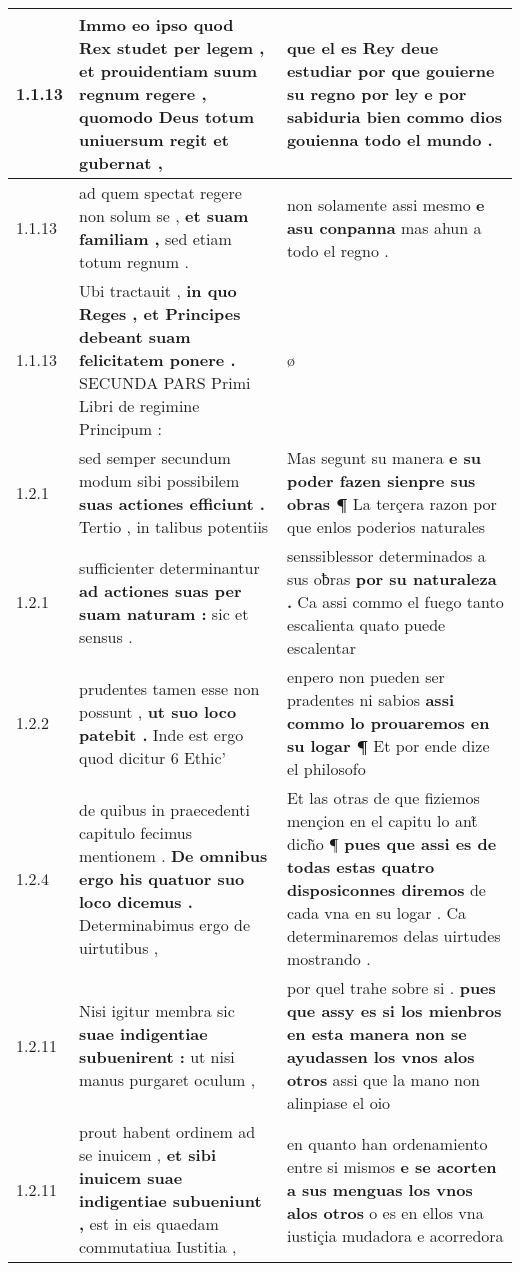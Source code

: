 \begin{tabular}{|p{1cm}|p{6.5cm}|p{6.5cm}|}
1.1.13 & Immo eo ipso quod Rex studet per legem , \textbf{ et prouidentiam suum regnum regere , } quomodo Deus totum uniuersum regit et gubernat , & que el es Rey deue estudiar \textbf{ por que gouierne su regno } por ley e por sabiduria bien commo dios gouienna todo el mundo . \\\hline
1.1.13 & ad quem spectat regere non solum se , \textbf{ et suam familiam , } sed etiam totum regnum . & non solamente assi mesmo \textbf{ e asu conpanna } mas ahun a todo el regno . \\\hline
1.1.13 & Ubi tractauit , \textbf{ in quo Reges , et Principes debeant suam felicitatem ponere . } SECUNDA PARS Primi Libri de regimine Principum : & ø \\\hline
1.2.1 & sed semper secundum modum sibi possibilem \textbf{ suas actiones efficiunt . } Tertio , in talibus potentiis & Mas segunt su manera \textbf{ e su poder fazen sienpre sus obras ¶ } La terçera razon por que enlos poderios naturales \\\hline
1.2.1 & sufficienter determinantur \textbf{ ad actiones suas per suam naturam : } sic et sensus . & senssiblessor determinados a sus oƀras \textbf{ por su naturaleza . } Ca assi commo el fuego tanto escalienta quato puede escalentar \\\hline
1.2.2 & prudentes tamen esse non possunt , \textbf{ ut suo loco patebit . } Inde est ergo quod dicitur 6 Ethic’ & enpero non pueden ser pradentes ni sabios \textbf{ assi commo lo prouaremos en su logar ¶ } Et por ende dize el philosofo \\\hline
1.2.4 & de quibus in praecedenti capitulo fecimus mentionem . \textbf{ De omnibus ergo his quatuor suo loco dicemus . } Determinabimus ergo de uirtutibus , & Et las otras de que fiziemos mençion en el capitu lo ant̃ dich̃o ¶ \textbf{ pues que assi es de todas estas quatro disposiconnes diremos } de cada vna en su logar . Ca determinaremos delas uirtudes mostrando . \\\hline
1.2.11 & Nisi igitur membra sic \textbf{ suae indigentiae subuenirent : } ut nisi manus purgaret oculum , & por quel trahe sobre si . \textbf{ pues que assy es si los mienbros en esta manera non se ayudassen los vnos alos otros } assi que la mano non alinpiase el oio \\\hline
1.2.11 & prout habent ordinem ad se inuicem , \textbf{ et sibi inuicem suae indigentiae subueniunt , } est in eis quaedam commutatiua Iustitia , & en quanto han ordenamiento entre si mismos \textbf{ e se acorten a sus menguas los vnos alos otros } o es en ellos vna iustiçia mudadora e acorredora \\\hline

\end{tabular}
